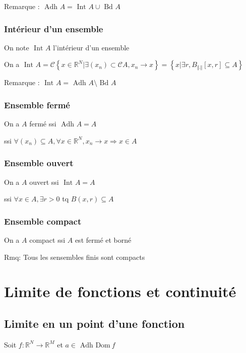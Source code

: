 \documentclass[a4paper,10pt]{article}
\newcommand{\Adh}{\mbox{ Adh }}
\newcommand{\Bd}{\mbox{ Bd }}
\newcommand{\Int}{\mbox{ Int }}
\newcommand{\ap}{\rightarrow}
\newcommand{\Dom}{\mathrm{Dom}\:}
\newcommand{\R}{\mathbb{R}}
\newcommand{\C}{\mathbb{C}}
\newcommand{\so}{\Rightarrow}
\newcommand{\tset}[1]{\left\lbrace #1 \right\rbrace}
\newcommand{\but}{\setminus}
\begin{document}
Remarque : $\Adh A = \Int A \cup \Bd A$

\subsubsection{Intérieur d'un ensemble}

On note $\Int A$ l'intérieur d'un ensemble

On a $\Int A = \mathcal{C} \tset{x \in \R^N \vert \exists(x_n) \subset \mathcal{C}A, x_n \ap x} = \tset{x \vert \exists r, B_{\Vert . \Vert} \left[ x,r \right] \subseteq A}$

Remarque : $\Int A = \Adh A \but \Bd A$


\subsubsection{Ensemble fermé}

On a $A$ fermé ssi $\Adh A = A$

ssi $\forall (x_n) \subseteq A, \forall x \in \R^N, x_n \ap x \so x \in A$

\subsubsection{Ensemble ouvert}

On a $A$ ouvert ssi $\Int A = A$

ssi $\forall x \in A, \exists r > 0$ tq $B(x,r) \subseteq A$

\subsubsection{Ensemble compact}

On a $A$ compact ssi $A$ est fermé et borné

Rmq: Tous les sensembles finis sont compacts

\section{Limite de fonctions et continuité}

\subsection{Limite en un point d'une fonction}

Soit $f: \R^N \ap \R^M$ et $a \in \Adh \Dom f$
\end{document}
